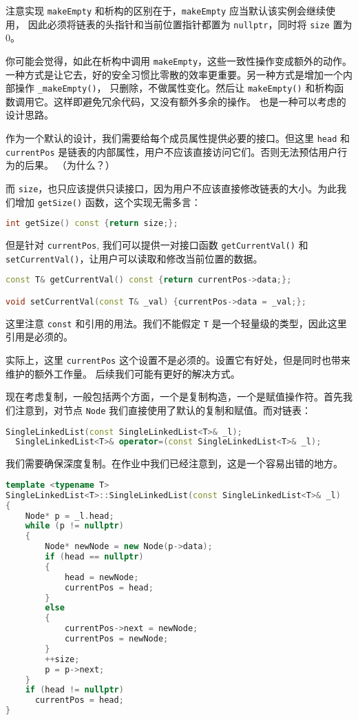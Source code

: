 \documentclass[a4paper]{ctexart}
\theoremstyle{definition}
\theoremstyle{definition}
\begin{document}
注意实现 \verb|makeEmpty| 和析构的区别在于，\verb|makeEmpty| 应当默认该实例会继续使用，
因此必须将链表的头指针和当前位置指针都置为 \verb|nullptr|，同时将 \verb|size| 置为 0。

你可能会觉得，如此在析构中调用 \verb|makeEmpty|，这些一致性操作变成额外的动作。
一种方式是让它去，好的安全习惯比零散的效率更重要。另一种方式是增加一个内部操作 \verb|_makeEmpty()|，
只删除，不做属性变化。然后让 \verb|makeEmpty()| 和析构函数调用它。这样即避免冗余代码，又没有额外多余的操作。
也是一种可以考虑的设计思路。
  
作为一个默认的设计，我们需要给每个成员属性提供必要的接口。但这里 
\verb|head| 和 \verb|currentPos| 是链表的内部属性，用户不应该直接访问它们。否则无法预估用户行为的后果。
（为什么？）

而 \verb|size|，也只应该提供只读接口，因为用户不应该直接修改链表的大小。为此我们增加 \verb|getSize()| 函数，这个实现无需多言：
\begin{lstlisting}[language=C++]
int getSize() const {return size;};
\end{lstlisting}

但是针对 \verb|currentPos|, 我们可以提供一对接口函数 \verb|getCurrentVal()| 和 \verb|setCurrentVal()|，让用户可以读取和修改当前位置的数据。

\begin{lstlisting}[language=C++]
const T& getCurrentVal() const {return currentPos->data;};

void setCurrentVal(const T& _val) {currentPos->data = _val;};
\end{lstlisting}

这里注意 \verb|const| 和引用的用法。我们不能假定 \verb|T| 是一个轻量级的类型，因此这里引用是必须的。

实际上，这里 \verb|currentPos| 这个设置不是必须的。设置它有好处，但是同时也带来维护的额外工作量。
后续我们可能有更好的解决方式。

现在考虑复制，一般包括两个方面，一个是复制构造，一个是赋值操作符。首先我们注意到，对节点 \verb|Node|
我们直接使用了默认的复制和赋值。而对链表：

\begin{lstlisting}[language=C++]
  SingleLinkedList(const SingleLinkedList<T>& _l);
  SingleLinkedList<T>& operator=(const SingleLinkedList<T>& _l);
\end{lstlisting}

我们需要确保深度复制。在作业中我们已经注意到，这是一个容易出错的地方。

\begin{lstlisting}[language=C++]
template <typename T>
SingleLinkedList<T>::SingleLinkedList(const SingleLinkedList<T>& _l)
{
    Node* p = _l.head;
    while (p != nullptr)
    {
        Node* newNode = new Node(p->data);
        if (head == nullptr)
        {
            head = newNode;
            currentPos = head;
        }
        else
        {
            currentPos->next = newNode;
            currentPos = newNode;
        }
        ++size;
        p = p->next;
    }
    if (head != nullptr)
      currentPos = head;
}
\end{lstlisting}
\end{document}
